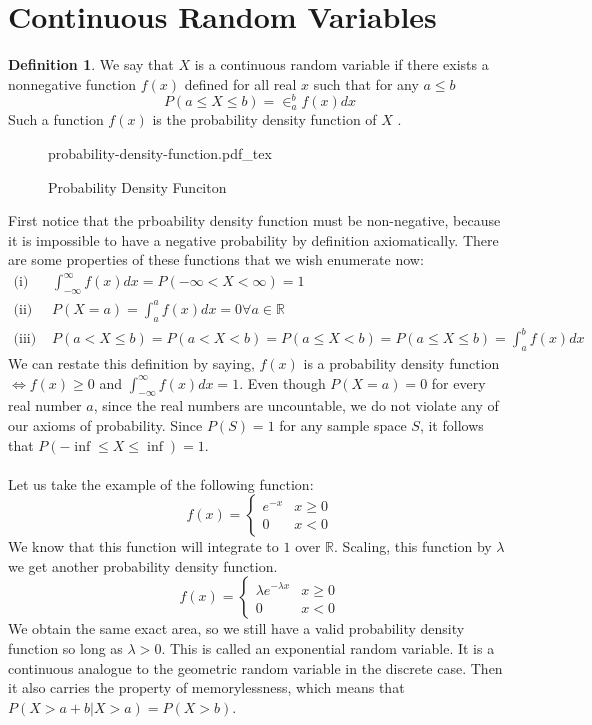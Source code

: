 \documentclass{article}
\newcommand{\incfig}[1]{%
    \def\svgwidth{\columnwidth}
    {#1.pdf_tex}
}
\theoremstyle{definition}
\newtheorem{definition}{Definition}[section]
\begin{document}
\section{Continuous Random Variables}
    \begin{mdframed}
        \begin{definition}
            We say that $X$ is a continuous random variable if there exists a 
            nonnegative function $f(x)$ defined for all real $x$ such that for any $a \leq b$
            \[
                P(a \leq X \leq b) = \in_a^bf(x)dx
            \]
            Such a function $f(x)$ is the probability density function of $X$ .
        \end{definition}
    \end{mdframed}
    \begin{figure}[ht]
        \centering
        \incfig{probability-density-function}
        \caption{Probability Density Funciton}
        \label{fig:probability-density-function}
    \end{figure}
    First notice that the prboability density function must be non-negative, because it is impossible
    to have a negative probability by definition axiomatically. There are some properties of these functions that we wish
    enumerate now:
    \begin{align*}
        \text{(i) } & \int_{-\infty}^\infty f(x)dx = P(-\infty < X < \infty ) = 1 \\
        \text{(ii) } & P(X = a) = \int_a^a f(x)dx = 0 \forall a \in \mathbb{R} \\
        \text{(iii) } & P(a < X \leq b) = P(a < X < b) = P(a \leq X < b) = P(a \leq X \leq b) = \int_a^bf(x)dx
    \end{align*}
    We can restate this definition by saying, $f(x)$ is a probability density function
    $\Leftrightarrow f(x) \geq 0$ and $\int_{-\infty}^\infty f(x)dx = 1$.
    Even though $P(X = a) = 0$ for every real number $a$, since the real numbers are uncountable,
    we do not violate any of our axioms of probability. Since $P(S) = 1$ for any sample space $S$,
    it follows that $P(-\inf \leq X \leq \inf) = 1$.\\\\
    Let us take the example of the following function:
    \[
        f(x) = \begin{cases}
            e^{-x} & x \geq 0\\
            0 & x < 0
        \end{cases}
    \]
    We know that this function will integrate to $1$ over $\mathbb{R}$.
    Scaling, this function by $\lambda$ we get another probability density function.
    \[ f(x) = \begin{cases}\lambda e^{-\lambda x} & x \geq 0\\ 0 & x < 0 \end{cases}\]
    We obtain the same exact area, so we still have a valid probability density function so
    long as $\lambda > 0$.
    This is called an exponential random variable.
    It is a continuous analogue to the geometric random variable in the discrete case. Then
    it also carries the property of memorylessness, which means that $P(X > a + b | X > a) = P(X > b)$.
\end{document}
